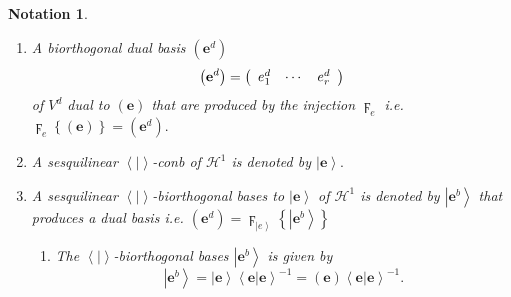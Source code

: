 \documentclass[aps,preprint]{revtex4}%
\newtheorem{notation}[theorem]{Notation}
\begin{document}
\begin{notation}
\begin{enumerate}
\item A biorthogonal dual basis $\left(  \mathbf{e}^{d}\right)  $
\begin{equation}
\left(  \mathbf{e}^{d}\right)  =\left(
\begin{array}
[c]{ccc}%
e_{1}^{d} & \cdots & e_{r}^{d}%
\end{array}
\right)
\end{equation}
of $V^{d}$ dual to $\left(  \mathbf{e}\right)  $ that are produced by the
injection $\digamma_{e}$ i.e. $\digamma_{e}\left\{  \left(  \mathbf{e}\right)
\right\}  =\left(  \mathbf{e}^{d}\right)  .$

\item A sesquilinear $\left\langle \left.  {}\right\vert \right\rangle $-conb
of $\mathcal{H}^{1}$ is denoted by $\left\vert \mathbf{e}\right\rangle .$

\item A sesquilinear $\left\langle \left.  {}\right\vert \right\rangle
$-biorthogonal bases to $\left\vert \mathbf{e}\right\rangle $ of
$\mathcal{H}^{1}$ is denoted by $\left\vert \mathbf{e}^{b}\right\rangle $ that
produces a dual basis i.e. $\left(  \mathbf{e}^{d}\right)  =\digamma
_{\left\vert e\right\rangle }\left\{  \left\vert \mathbf{e}^{b}\right\rangle
\right\}  $

\begin{enumerate}
\item The $\left\langle \left.  {}\right\vert \right\rangle $-biorthogonal
bases $\left\vert \mathbf{e}^{b}\right\rangle $ is given by
\begin{equation}
\left\vert \mathbf{e}^{b}\right\rangle =\left\vert \mathbf{e}\right\rangle
\left\langle \left.  \mathbf{e}\right\vert \mathbf{e}\right\rangle
^{-1}=\left(  \mathbf{e}\right)  \left\langle \left.  \mathbf{e}\right\vert
\mathbf{e}\right\rangle ^{-1}.
\end{equation}



\end{enumerate}
\end{enumerate}
\end{notation}
\end{document}
